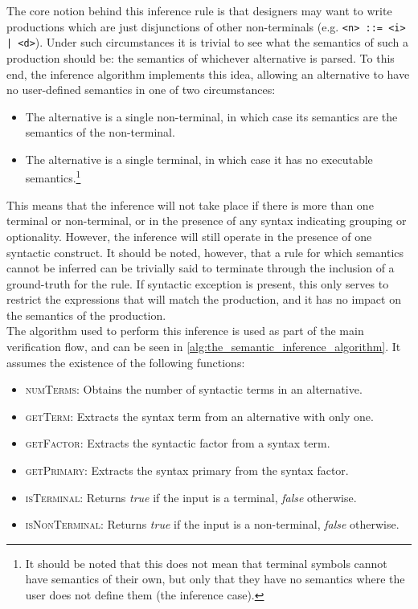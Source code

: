 The core notion behind this inference rule is that designers may want to write productions which are just disjunctions of other non-terminals (e.g. \texttt{<n> ::= <i> | <d>}).
Under such circumstances it is trivial to see what the semantics of such a production should be: the semantics of whichever alternative is parsed. 
To this end, the inference algorithm implements this idea, allowing an alternative to have no user-defined semantics in one of two circumstances:
\begin{itemize}
    \item The alternative is a single non-terminal, in which case its semantics are the semantics of the non-terminal.
    \item The alternative is a single terminal, in which case it has no executable semantics.\footnote{It should be noted that this does not mean that terminal symbols cannot have semantics of their own, but only that they have no semantics where the user does not define them (the inference case).}  
\end{itemize}

This means that the inference will not take place if there is more than one terminal or non-terminal, or in the presence of any syntax indicating grouping or optionality. 
However, the inference will still operate in the presence of one syntactic construct.
It should be noted, however, that a rule for which semantics cannot be inferred can be trivially said to terminate through the inclusion of a ground-truth for the rule. 
If syntactic exception is present, this only serves to restrict the expressions that will match the production, and it has no impact on the semantics of the production.\\

The algorithm used to perform this inference is used as part of the main verification flow, and can be seen in \autoref{alg:the_semantic_inference_algorithm}.
It assumes the existence of the following functions:
\begin{itemize}
    \item \textsc{numTerms}: Obtains the number of syntactic terms in an alternative. 
    \item \textsc{getTerm}: Extracts the syntax term from an alternative with only one.
    \item \textsc{getFactor}: Extracts the syntactic factor from a syntax term.
    \item \textsc{getPrimary}: Extracts the syntax primary from the syntax factor.
    \item \textsc{isTerminal}: Returns \textit{true} if the input is a terminal, \textit{false} otherwise.
    \item \textsc{isNonTerminal}: Returns \textit{true} if the input is a non-terminal, \textit{false} otherwise.
\end{itemize}

